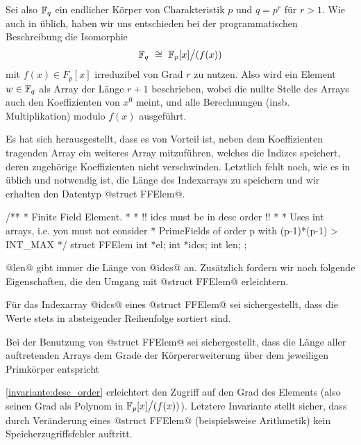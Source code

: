 Sei also $\mathbb{F}_q$ ein endlicher Körper von Charakteristik $p$ und $q = p^r$
für $r>1$.
Wie auch in \sage üblich, haben wir uns entschieden bei der programmatischen
Beschreibung die Isomorphie
\[ \mathbb{F}_q \ \cong\  \mathbb{F}_p[x] \big/ (f(x))\]
mit $f(x) \in F_p[x]$ irreduzibel von Grad $r$ zu nutzen. 
Also wird ein Element $w \in \mathbb{F}_q$ als Array der Länge $r+1$ beschrieben,
wobei die nullte Stelle des Arrays auch den Koeffizienten von $x^0$ meint, und
alle Berechnungen (insb. Multiplikation) modulo $f(x)$ ausgeführt.

Es hat sich herausgestellt, dass es von Vorteil ist, neben dem Koeffizienten
tragenden Array ein weiteres Array mitzuführen, welches die
Indizes speichert, deren zugehörige Koeffizienten nicht verschwinden. Letztlich
fehlt noch, wie es in \Clang üblich und notwendig ist, die Länge des
Indexarrays zu speichern und wir erhalten den Datentyp @struct FFElem@.

\begin{ccode}[caption={Aus \url{../Sage/enumeratePCNs.c}},
  firstnumber=15]
/**
 * Finite Field Element. 
 * 
 * !! idcs must be in desc order !!
 *
 * Uses int arrays, i.e. you must not consider 
 * PrimeFields of order p with  (p-1)*(p-1) > INT_MAX
 */
struct FFElem{
    int *el;
    int *idcs;
    int len;
};
\end{ccode}

@len@ gibt immer die Länge von @idcs@ an. Zusätzlich fordern wir noch folgende
Eigenschaften, die den Umgang mit @struct FFElem@ erleichtern.

\begin{invariante}
  \label{invariante:desc_order}
  Für das Indexarray @idcs@ eines @struct FFElem@ sei sichergestellt, 
  dass die Werte stets in absteigender Reihenfolge sortiert sind. 
\end{invariante}

\begin{invariante}
  \label{invariante:array_len}
  Bei der Benutzung von @struct FFElem@ sei sichergestellt, 
  dass die Länge aller auftretenden Arrays dem Grade der 
  Körpererweiterung über dem jeweiligen Primkörper entspricht
\end{invariante}

\cref{invariante:desc_order} erleichtert den Zugriff auf
den Grad des Elements (also seinen Grad als Polynom in
$\mathbb{F}_p[x]\big/(f(x))$). Letztere Invariante stellt sicher, dass durch
Veränderung eines @struct FFElem@ (beispielsweise Arithmetik) kein 
Speicherzugriffsfehler auftritt.

